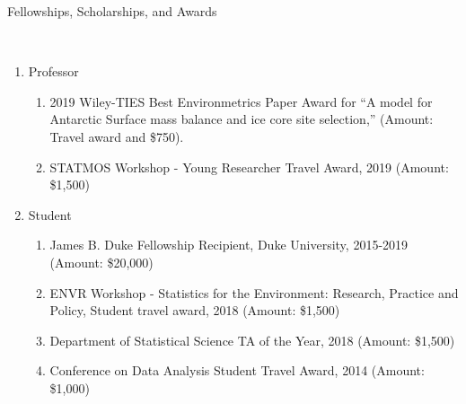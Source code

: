 \documentclass[12pt]{article}
\newcommand{\head}[1]{ %
    \bigskip %
    \begin{large}\begin{bf}{#1}\end{bf}\end{large} %

    \ \\ [-1.3cm] %

    \hrulefill}
\begin{document}
\head{Fellowships, Scholarships, and Awards}
\begin{enumerate}[label=$\bullet$]

\item Professor
\begin{enumerate}[label=$\cdot$]
\item 2019 Wiley-TIES Best Environmetrics Paper Award for ``A model for Antarctic Surface mass balance and ice core site selection,''  (Amount: Travel award and \$750).
\item STATMOS Workshop - Young Researcher Travel Award, 2019  (Amount: \$1,500)
\end{enumerate}
\item Student
\begin{enumerate}[label=$\cdot$]
\item James B. Duke Fellowship Recipient, Duke University, 2015-2019 (Amount: \$20,000)
\item ENVR Workshop - Statistics for the Environment: Research, Practice and Policy, Student travel award, 2018 (Amount: \$1,500)
\item Department of Statistical Science TA of the Year, 2018 (Amount: \$1,500)
\item Conference on Data Analysis Student Travel Award, 2014 (Amount: \$1,000)
\end{enumerate}

\end{enumerate}
\end{document}
